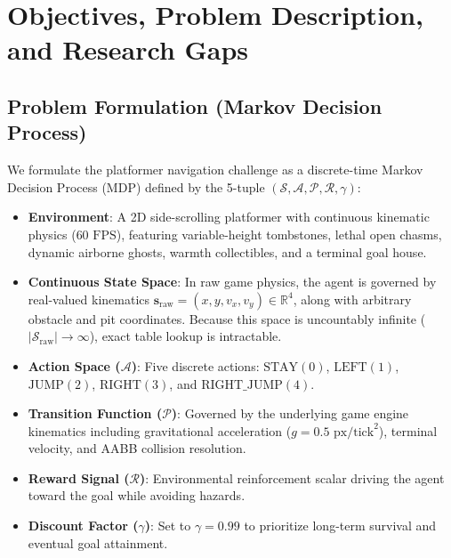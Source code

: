 \section{Objectives, Problem Description, and Research Gaps}
\label{sec:objectives}

\subsection{Problem Formulation (Markov Decision Process)}
We formulate the platformer navigation challenge as a discrete-time Markov Decision Process (MDP) defined by the 5-tuple $(\mathcal{S}, \mathcal{A}, \mathcal{P}, \mathcal{R}, \gamma)$:
\begin{itemize}
    \item \textbf{Environment}: A 2D side-scrolling platformer with continuous kinematic physics ($60\text{ FPS}$), featuring variable-height tombstones, lethal open chasms, dynamic airborne ghosts, warmth collectibles, and a terminal goal house.
    \item \textbf{Continuous State Space}: In raw game physics, the agent is governed by real-valued kinematics $\mathbf{s}_{\text{raw}} = (x, y, v_x, v_y) \in \mathbb{R}^4$, along with arbitrary obstacle and pit coordinates. Because this space is uncountably infinite ($|\mathcal{S}_{\text{raw}}| \to \infty$), exact table lookup is intractable.
    \item \textbf{Action Space ($\mathcal{A}$)}: Five discrete actions: $\text{STAY} (0)$, $\text{LEFT} (1)$, $\text{JUMP} (2)$, $\text{RIGHT} (3)$, and $\text{RIGHT\_JUMP} (4)$.
    \item \textbf{Transition Function ($\mathcal{P}$)}: Governed by the underlying game engine kinematics including gravitational acceleration ($g = 0.5\text{ px/tick}^2$), terminal velocity, and AABB collision resolution.
    \item \textbf{Reward Signal ($\mathcal{R}$)}: Environmental reinforcement scalar driving the agent toward the goal while avoiding hazards.
    \item \textbf{Discount Factor ($\gamma$)}: Set to $\gamma = 0.99$ to prioritize long-term survival and eventual goal attainment.
\end{itemize}

